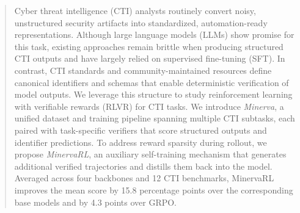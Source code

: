 \begin{abstract}

Cyber threat intelligence (CTI) analysts routinely convert noisy, unstructured security artifacts into standardized, automation-ready representations. Although large language models (LLMs) show promise for this task, existing approaches remain brittle when producing structured CTI outputs and have largely relied on supervised fine-tuning (SFT). In contrast, CTI standards and community-maintained resources define canonical identifiers and schemas that enable deterministic verification of model outputs. We leverage this structure to study reinforcement learning with verifiable rewards (RLVR) for CTI tasks. We introduce \textit{Minerva}, a unified dataset and training pipeline spanning multiple CTI subtasks, each paired with task-specific verifiers that score structured outputs and identifier predictions. To address reward sparsity during rollout, we propose \textit{MinervaRL}, an auxiliary self-training mechanism that generates additional verified trajectories and distills them back into the model. Averaged across four backbones and 12 CTI benchmarks, MinervaRL improves the mean score by 15.8 percentage points over the corresponding base models and by 4.3 points over GRPO.

\end{abstract}
